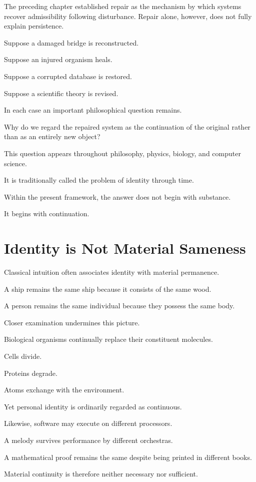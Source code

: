 \documentclass[11pt,oneside]{book}
\numberwithin{equation}{chapter}
\theoremstyle{definition}
\theoremstyle{plain}
\begin{document}
The preceding chapter established repair as the mechanism by which systems
recover admissibility following disturbance. Repair alone, however, does not
fully explain persistence.

Suppose a damaged bridge is reconstructed.

Suppose an injured organism heals.

Suppose a corrupted database is restored.

Suppose a scientific theory is revised.

In each case an important philosophical question remains.

Why do we regard the repaired system as the continuation of the original
rather than as an entirely new object?

This question appears throughout philosophy, physics, biology, and computer
science.

It is traditionally called the problem of identity through time.

Within the present framework, the answer does not begin with substance.

It begins with continuation.

\section{Identity is Not Material Sameness}

Classical intuition often associates identity with material permanence.

A ship remains the same ship because it consists of the same wood.

A person remains the same individual because they possess the same body.

Closer examination undermines this picture.

Biological organisms continually replace their constituent molecules.

Cells divide.

Proteins degrade.

Atoms exchange with the environment.

Yet personal identity is ordinarily regarded as continuous.

Likewise, software may execute on different processors.

A melody survives performance by different orchestras.

A mathematical proof remains the same despite being printed in different
books.

Material continuity is therefore neither necessary nor sufficient.
\end{document}
